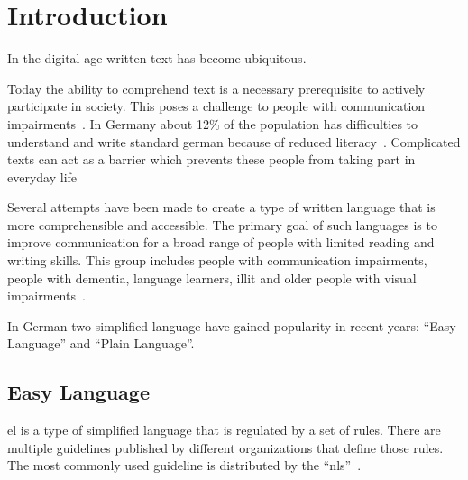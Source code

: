 \chapter{Introduction}\label{ch:introduction}

In the digital age written text has become ubiquitous. %

Today the ability to comprehend text is a necessary prerequisite to actively participate in society. %
This poses a challenge to people with communication impairments~\autocite{easyLanguageBook}.
In Germany about 12\% of the population has difficulties to understand and write standard german because of reduced literacy~\autocite{schomacker2023data}.
Complicated texts can act as a barrier which prevents these people from taking part in everyday life~\autocite{easyLanguageBook}

Several attempts have been made to create a type of written language that is more comprehensible and accessible.
The primary goal of such languages is to improve communication for a broad range of people with limited reading and writing skills.
This group includes people with communication impairments, people with dementia, language learners, \gls{illit} and older people with visual impairments~\autocite{easyLanguageBook}.

In German two simplified language have gained popularity in recent years: \enquote{Easy Language} and \enquote{Plain Language}.



\section{Easy Language}\label{sec:el}

\gls{el} is a type of simplified language that is regulated by a set of rules.
There are multiple guidelines published by different organizations that define those rules.
The most commonly used guideline is distributed by the \enquote{\gls{nls}}~\autocite{netzwerkLS, easyLanguageBook}.

